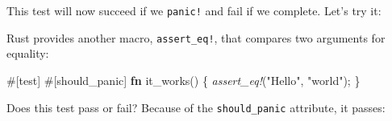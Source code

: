 \documentclass[a4paper,]{book}
\newenvironment{Shaded}{\begin{snugshade}}{\end{snugshade}}
\newcommand{\KeywordTok}[1]{\textcolor[rgb]{0.13,0.29,0.53}{\textbf{{#1}}}}
\newcommand{\StringTok}[1]{\textcolor[rgb]{0.31,0.60,0.02}{{#1}}}
\newcommand{\PreprocessorTok}[1]{\textcolor[rgb]{0.56,0.35,0.01}{\textit{{#1}}}}
\newcommand{\AttributeTok}[1]{\textcolor[rgb]{0.77,0.63,0.00}{{#1}}}
\newcommand{\NormalTok}[1]{{#1}}
\begin{document}
This test will now succeed if we \texttt{panic!} and fail if we
complete. Let's try it:

\begin{Shaded}
\end{Shaded}

Rust provides another macro, \texttt{assert\_eq!}, that compares two
arguments for equality:

\begin{Shaded}
\begin{Highlighting}[]
\AttributeTok{#[}\NormalTok{test}\AttributeTok{]}
\AttributeTok{#[}\NormalTok{should_panic}\AttributeTok{]}
\KeywordTok{fn} \NormalTok{it_works() \{}
    \PreprocessorTok{assert_eq!}\NormalTok{(}\StringTok{"Hello"}\NormalTok{, }\StringTok{"world"}\NormalTok{);}
\NormalTok{\}}
\end{Highlighting}
\end{Shaded}

Does this test pass or fail? Because of the \texttt{should\_panic}
attribute, it passes:
\end{document}
